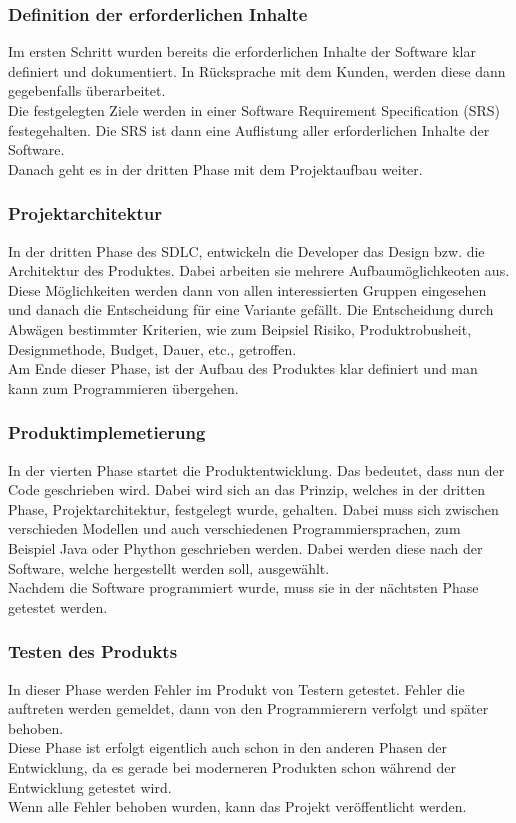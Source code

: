 \documentclass[a4paper, 10pt]{scrartcl}
\begin{document}
\subsubsection{Definition der erforderlichen Inhalte}
Im ersten Schritt wurden bereits die erforderlichen Inhalte der Software klar definiert und dokumentiert. In Rücksprache mit dem Kunden, werden diese dann gegebenfalls überarbeitet.\\
Die festgelegten Ziele werden in einer \glqq Software Requirement Specification (SRS)\grqq{} festegehalten. Die SRS ist dann eine Auflistung aller erforderlichen Inhalte der Software.\\
Danach geht es in der dritten Phase mit dem Projektaufbau weiter.
\subsubsection{Projektarchitektur}
In der dritten Phase des SDLC, entwickeln die Developer das Design bzw. die Architektur des Produktes. Dabei arbeiten sie mehrere Aufbaumöglichkeoten aus. Diese Möglichkeiten werden dann von allen interessierten Gruppen eingesehen und danach die Entscheidung für eine Variante gefällt. Die Entscheidung durch Abwägen bestimmter Kriterien, wie zum Beipsiel Risiko, Produktrobusheit, Designmethode, Budget, Dauer, etc., getroffen. \\
Am Ende dieser Phase, ist der Aufbau des Produktes klar definiert und man kann zum Programmieren übergehen.
\subsubsection{Produktimplemetierung}
In der vierten Phase startet die Produktentwicklung. Das bedeutet, dass nun der Code geschrieben wird. Dabei wird sich an das Prinzip, welches in der dritten Phase, Projektarchitektur, festgelegt wurde, gehalten. Dabei muss sich zwischen verschieden Modellen und auch verschiedenen Programmiersprachen, zum Beispiel Java oder Phython geschrieben werden. Dabei werden diese nach der Software, welche hergestellt werden soll, ausgewählt.\\
Nachdem die Software programmiert wurde, muss sie in der nächtsten Phase getestet werden.
\subsubsection{Testen des Produkts}
In dieser Phase werden Fehler im Produkt von Testern getestet. Fehler die auftreten werden gemeldet, dann von den Programmierern verfolgt und später behoben. \\ 
Diese Phase ist erfolgt eigentlich auch schon in den anderen Phasen der Entwicklung, da es gerade bei moderneren Produkten schon während der Entwicklung getestet wird.\\
Wenn alle Fehler behoben wurden, kann das Projekt veröffentlicht werden.
\end{document}
